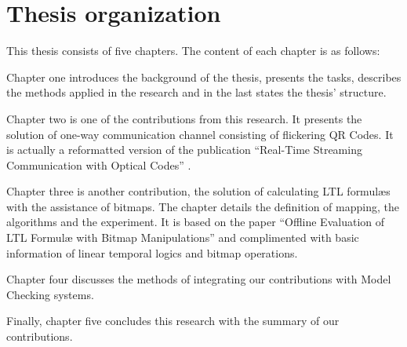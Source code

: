 \section{Thesis organization}

This thesis consists of five chapters. The content of each chapter is as follows:

Chapter one introduces the background of the thesis, presents the tasks, describes the methods applied in the research and in the last states the thesis' structure.

Chapter two is one of the contributions from this research. It presents the solution of one-way communication channel consisting of flickering QR Codes. It is actually a reformatted version of the publication ``Real-Time Streaming Communication with Optical Codes'' \citep{kxie7370891}.

Chapter three is another contribution, the solution of calculating LTL formul\ae{}s with the assistance of bitmaps. The chapter details the definition of mapping, the algorithms and the experiment. It is based on the paper ``Offline Evaluation of LTL Formulæ with Bitmap
Manipulations'' and complimented with basic information of linear temporal logics and bitmap operations.

Chapter four discusses the methods of integrating our contributions with Model Checking systems.

Finally, chapter five concludes this research with the summary of our contributions.